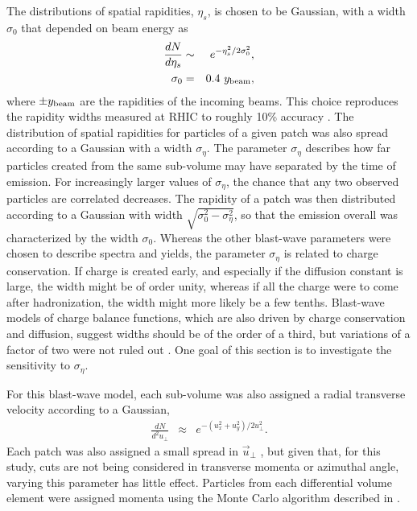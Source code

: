 The distributions of spatial rapidities, $\eta_s$, is chosen to be Gaussian, with a width $\sigma_0$ that depended on beam energy as
\begin{eqnarray}
\frac{dN}{d\eta_s}&\sim& e^{-\eta_s^2/2\sigma_0^2},\\
\nonumber
\sigma_0&=&0.4~y_{\rm beam},
\end{eqnarray}
where $\pm y_{\rm beam}$ are the rapidities of the incoming beams. This choice reproduces the rapidity widths measured at RHIC to roughly 10\% accuracy \cite{Flores:2016mtp}. The distribution of spatial rapidities for particles of a given patch was also spread according to a Gaussian with a width $\sigma_\eta$. The parameter $\sigma_\eta$ describes how far particles created from the same sub-volume may have separated by the time of emission. For increasingly larger values of $\sigma_\eta$, the chance that any two observed particles are correlated decreases. The rapidity of a patch was then distributed according to a Gaussian with width $\sqrt{\sigma_0^2-\sigma_\eta^2}$, so that the emission overall was characterized by the width $\sigma_0$. Whereas the other blast-wave parameters were chosen to describe spectra and yields, the parameter $\sigma_\eta$ is related to charge conservation. If charge is created early, and especially if the diffusion constant is large, the width might be of order unity, whereas if all the charge were to come after hadronization, the width might more likely be a few tenths. Blast-wave models of charge balance functions, which are also driven by charge conservation and diffusion, suggest widths should be of the order of a third, but variations of a factor of two were not ruled out \cite{Schlichting:2010qia}. One goal of this section is to investigate the sensitivity to $\sigma_\eta$.

For this blast-wave model, each sub-volume was also assigned a radial transverse velocity according to a Gaussian,
\begin{eqnarray}
\frac{dN}{d^2u_\perp}&\approx&e^{-(u_x^2+u_y^2)/2u_\perp^2}.
\end{eqnarray}
Each patch was also assigned a small spread in $\vec{u}_\perp$ , but given that, for this study, cuts are not being considered in transverse momenta or azimuthal angle, varying this parameter has little effect. Particles from each differential volume element were assigned momenta using the Monte Carlo algorithm described in \cite{Pratt:2010jt}.

